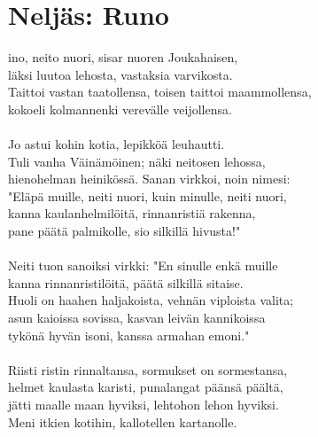 
\chapter*{Neljäs: Runo}

ino, neito nuori, sisar nuoren Joukahaisen,        \\
läksi luutoa lehosta, vastaksia varvikosta.                    \\
Taittoi vastan taatollensa, toisen taittoi maammollensa,       \\
kokoeli kolmannenki verevälle veijollensa.                     \\
                                                               \\
Jo astui kohin kotia, lepikköä leuhautti.                      \\
Tuli vanha Väinämöinen; näki neitosen lehossa,                 \\
hienohelman heinikössä. Sanan virkkoi, noin nimesi:            \\
"Eläpä muille, neiti nuori, kuin minulle, neiti nuori,         \\
kanna kaulanhelmilöitä, rinnanristiä rakenna,                  \\
pane päätä palmikolle, sio silkillä hivusta!"                  \\
                                                               \\
Neiti tuon sanoiksi virkki: "En sinulle enkä muille            \\
kanna rinnanristilöitä, päätä silkillä sitaise.                \\
Huoli on haahen haljakoista, vehnän viploista valita;          \\
asun kaioissa sovissa, kasvan leivän kannikoissa               \\
tykönä hyvän isoni, kanssa armahan emoni."                     \\
                                                               \\
Riisti ristin rinnaltansa, sormukset on sormestansa,           \\
helmet kaulasta karisti, punalangat päänsä päältä,             \\
jätti maalle maan hyviksi, lehtohon lehon hyviksi.             \\
Meni itkien kotihin, kallotellen kartanolle.                   \\
